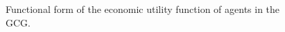 \documentclass[12pt, a4paper]{article}
\begin{document}
\begin{figure}
	\caption{Functional form of the economic utility function of agents in the GCG.}
	\label{Fig: CH3_GCG1_Economic utility function} 
	\begin{center}
	\end{center}
\end{figure}

\end{document}
